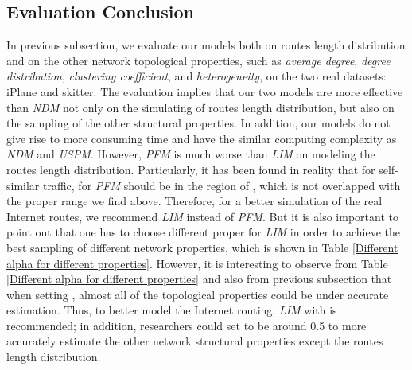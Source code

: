 \documentclass[a4paper]{llncs}
\begin{document}
\subsection{Evaluation Conclusion}
In previous subsection, we evaluate our models both on routes length
distribution and on the other network topological properties, such as {\it
average degree}, {\it degree distribution}, {\it clustering
coefficient}, and {\it heterogeneity}, on the two real datasets: iPlane
and skitter. The evaluation implies that our two models are more effective than \textit{NDM} not only on the simulating of routes length distribution, but also on the sampling of the other structural properties. In addition, our models
do not give rise to more consuming time and have the similar
computing complexity as \textit{NDM} and \textit{USPM}. However,
\textit{PFM} is much worse than \textit{LIM} on modeling the routes
length distribution. Particularly, it has been found in reality that for self-similar traffic,
 for \textit{PFM} should be in the region of 
\cite{ParetoModulatedModel}, which is not overlapped with the proper
range we find above. Therefore, for a better simulation of the real
Internet routes, we recommend \textit{LIM} instead of \textit{PFM}.
But it is also important to point out that one has to
choose different proper  for \textit{LIM} in order to
achieve the best sampling of different network properties, which is shown in
Table \ref{Different alpha for different properties}. However,
it is interesting to observe from Table \ref{Different alpha for
different properties} and also from previous subsection that when
setting , almost all of the topological properties could be under
accurate estimation. Thus, to better model the Internet routing, \textit{LIM} with  is recommended; in
addition, researchers could set  to be around 0.5 to more
accurately estimate the other network structural properties except the routes
length distribution.
\end{document}
